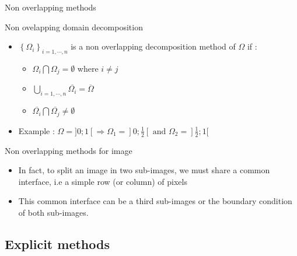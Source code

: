 \documentclass[compress,10pt,aspectratio=169]{beamer}
\begin{document}
\begin{frame}[fragile]{Non overlapping methods}
  \scriptsize
  \begin{block}{\small Non ovelapping domain decomposition}
    \begin{itemize}
      \item $\left\{\Omega_{i}\right\}_{i=1,\cdots,n}$ is a non overlapping decomposition method of $\Omega$ if :
      \begin{itemize}
        \item {\scriptsize $\Omega_{i} \bigcap \Omega_{j} = \emptyset$ where $i\neq j$}
        \item {\scriptsize $\displaystyle \bigcup_{i=1,\cdots,n}\overline{\Omega_{i}} = \overline{\Omega}$}
        \item {\scriptsize $\overline{\Omega_{i}} \bigcap \overline{\Omega_{j}} \neq \emptyset$}
      \end{itemize}
      \item Example : $\Omega = ]0;1[ \Rightarrow \Omega_{1} = ]0;\frac{1}{2}[ \mbox{ and } \Omega_{2} = ]\frac{1}{2};1[$
    \end{itemize}
  \end{block}

  \begin{exampleblock}{\small Non overlapping methods for image}
    \begin{itemize}
      \item In fact, to split an image in two sub-images, we must share a common interface, i.e a simple row (or column) of pixels
      \item This common interface can be a third sub-images or the boundary condition of both sub-images.
    \end{itemize}
  \end{exampleblock}
\end{frame}

\subsection{Explicit methods}
\end{document}
